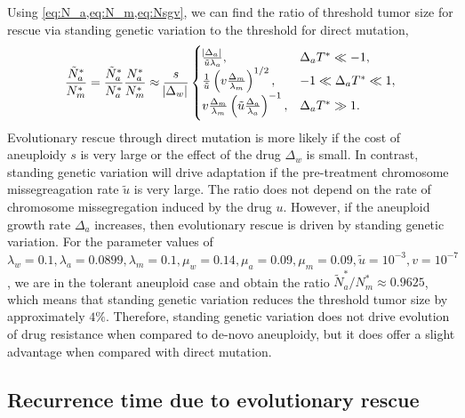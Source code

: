 \documentclass[12pt]{extarticle}
\begin{document}
Using \cref{eq:N_a,eq:N_m,eq:Nsgv}, we can find the ratio of threshold tumor size for rescue via standing genetic variation  to the threshold for direct mutation,
\begin{equation} \label{eq:N_sgv_ratio}
\frac{\tilde{N}^*_a}{N^*_m}=\frac{\tilde{N}^*_{a}}{N^*_{a}} \frac{N^*_a}{N^*_m} \approx \frac{s}{\abs{\Delta_w}}\begin{cases}
    \frac{\abs{\Delta_a}}{\tilde{u}\lambda_a} ,&
  \Delta_a T^* \ll -1 ,\\ 
  \frac{1}{\tilde{u}}\left(v \frac{\Delta_m}{\lambda_m}\right)^{1/2} ,&
  -1 \ll \Delta_a T^* \ll 1  ,\\ 
  v \frac{\Delta_m}{\lambda_m} \left(\tilde{u}\frac{\Delta_a}{\lambda_a}\right)^{-1}  ,&
   \Delta_a T^* \gg 1 .
  \end{cases}
\end{equation}
Evolutionary rescue through direct mutation is more likely if the cost of aneuploidy $s$ is very large or the effect of the drug $\Delta_w$ is small.  In contrast, standing genetic variation will drive adaptation if the pre-treatment chromosome missegreagation rate $\tilde{u}$ is very large. The ratio does not depend on the rate of chromosome missegregation induced by the drug $u$. However, if the aneuploid growth rate $\Delta_a$ increases, then evolutionary rescue is driven by standing genetic variation. For the parameter values of  $\lambda_w=0.1, \lambda_a=0.0899,\lambda_m=0.1,\mu_w=0.14,\mu_a=0.09,\mu_m=0.09, \tilde{u}=10^{-3}, v=10^{-7}$, we are in the tolerant aneuploid case and obtain the ratio $\tilde{N}^*_a/N^*_m \approx 0.9625$, which means that standing genetic variation reduces the threshold tumor size by approximately $4\%$. Therefore, standing genetic variation does not drive evolution of drug resistance when compared to de-novo aneuploidy, but it does offer a slight advantage when compared with direct mutation.


\subsection*{Recurrence time due to evolutionary rescue}
\end{document}
